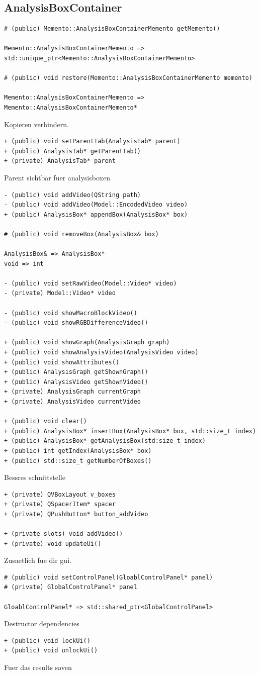 \documentclass[parskip=full]{scrartcl}
\begin{document}
\subsection{AnalysisBoxContainer}
\begin{verbatim}
# (public) Memento::AnalysisBoxContainerMemento getMemento()

Memento::AnalysisBoxContainerMemento => std::unique_ptr<Memento::AnalysisBoxContainerMemento>

# (public) void restore(Memento::AnalysisBoxContainerMemento memento)

Memento::AnalysisBoxContainerMemento => Memento::AnalysisBoxContainerMemento*
\end{verbatim}
Kopieren verhindern.
\begin{verbatim}
+ (public) void setParentTab(AnalysisTab* parent)
+ (public) AnalysisTab* getParentTab()
+ (private) AnalysisTab* parent
\end{verbatim}
Parent sichtbar fuer analysisboxen
\begin{verbatim}
- (public) void addVideo(QString path)
- (public) void addVideo(Model::EncodedVideo video)
+ (public) AnalysisBox* appendBox(AnalysisBox* box)

# (public) void removeBox(AnalysisBox& box)

AnalysisBox& => AnalysisBox*
void => int

- (public) void setRawVideo(Model::Video* video)
- (private) Model::Video* video

- (public) void showMacroBlockVideo()
- (public) void showRGBDifferenceVideo()

+ (public) void showGraph(AnalysisGraph graph)
+ (public) void showAnalysisVideo(AnalysisVideo video)
+ (public) void showAttributes()
+ (public) AnalysisGraph getShownGraph()
+ (public) AnalysisVideo getShownVideo()
+ (private) AnalysisGraph currentGraph
+ (private) AnalysisVideo currentVideo

+ (public) void clear()
+ (public) AnalysisBox* insertBox(AnalysisBox* box, std::size_t index)
+ (public) AnalysisBox* getAnalysisBox(std:size_t index)
+ (public) int getIndex(AnalysisBox* box)
+ (public) std::size_t getNumberOfBoxes()
\end{verbatim}
Bessres schnittstelle
\begin{verbatim}
+ (private) QVBoxLayout v_boxes
+ (private) QSpacerItem* spacer
+ (private) QPushButton* button_addVideo

+ (private slots) void addVideo()
+ (private) void updateUi()
\end{verbatim}
Zusaetlich fue dir gui.
\begin{verbatim}
# (public) void setControlPanel(GloablControlPanel* panel)
# (private) GlobalControlPanel* panel

GloablControlPanel* => std::shared_ptr<GlobalControlPanel>
\end{verbatim}
Destructor dependencies
\begin{verbatim}
+ (public) void lockUi()
+ (public) void unlockUi()
\end{verbatim}
Fuer das results saven
\end{document}
